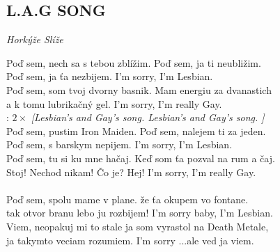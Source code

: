 \begin{flushleft}
	\section*{\Huge L.A.G SONG}
	\emph{Horkýže Slíže}
\end{flushleft}

Poď sem, nech sa s tebou zblížim.
Poď sem, ja ti neubližim.\\
Poď sem, ja ťa nezbijem.
I'm sorry, I'm Lesbian.\\

Poď sem, som tvoj dvorny basnik.
Mam energiu za dvanastich\\
a k tomu lubrikačný gel.
I'm sorry, I'm really Gay.\\

\textregistered:
$2\times$ \emph{[Lesbian's and Gay's song. Lesbian's and Gay's song. ]}\\

Poď sem, pustim Iron Maiden.
Poď sem, nalejem ti za jeden.\\
Poď sem, s barskym nepijem.
I'm sorry, I'm Lesbian.\\

Poď sem, tu si ku mne hačaj.
Keď som ťa pozval na rum a čaj.\\
Stoj! Nechod nikam! Čo je? Hej!
I'm sorry, I'm really Gay.\\

\textregistered\\

Poď sem, spolu mame v plane.
že ťa okupem vo fontane.\\
tak otvor branu lebo ju rozbijem!
I'm sorry baby, I'm Lesbian.\\

Viem, neopakuj mi to stale
ja som vyrastol na Death Metale,\\
ja takymto veciam rozumiem.
I'm sorry ...ale ved ja viem.\\

\textregistered \textregistered

\newpage
